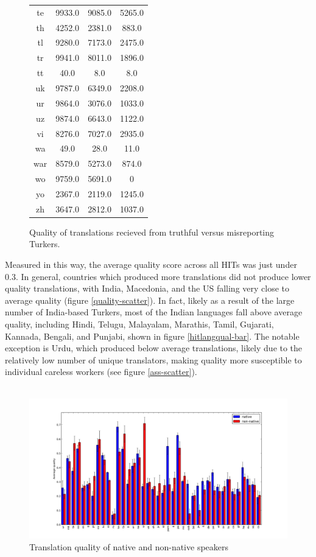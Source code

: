 \documentclass[11pt]{article}
\begin{document}
\begin{figure}[h]
\begin{tabular}{cccc}
te&9933.0&9085.0&5265.0\\
th&4252.0&2381.0&883.0\\
tl&9280.0&7173.0&2475.0\\
tr&9941.0&8011.0&1896.0\\
tt&40.0&8.0&8.0\\
uk&9787.0&6349.0&2208.0\\
ur&9864.0&3076.0&1033.0\\
uz&9874.0&6643.0&1122.0\\
vi&8276.0&7027.0&2935.0\\
wa&49.0&28.0&11.0\\
war&8579.0&5273.0&874.0\\
wo&9759.0&5691.0&0\\
yo&2367.0&2119.0&1245.0\\
zh&3647.0&2812.0&1037.0\\
\hline\hline
\end{tabular}
\label{mism-tab}
\caption{Quality of translations recieved from truthful versus misreporting Turkers.}
\end{figure}

Measured in this way, the average quality score across all HITs was just under 0.3. In general, countries which produced more translations did not produce lower quality translations, with India, Macedonia, and the US falling very close to average quality (figure \ref{quality-scatter}). In fact, likely as a result of the large number of India-based Turkers, most of the Indian languages fall above average quality, including Hindi, Telugu, Malayalam, Marathis, Tamil, Gujarati, Kannada, Bengali, and Punjabi, shown in figure \ref{hitlangqual-bar}. The notable exception is Urdu, which produced below average translations, likely due to the relatively low number of unique translators, making quality more susceptible to individual careless workers (see figure \ref{ass-scatter}). \\\\

\begin{figure}[h]
\centering
\includegraphics[width=6in]{figures/quality-natlang-sorted}
\caption{Translation quality of native and non-native speakers}
\label{natlangqual-bar}
\end{figure}
\end{document}
